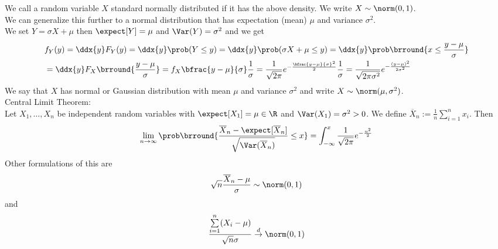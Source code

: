 We call a random variable $X$ standard normally distributed if it has the above density. We write $X\sim\norm(0,1)$.\\
We can generalize this further to a normal distribution that has expectation (mean) $\mu$ and variance $\sigma^2$.\\
We set $Y=\sigma X+\mu$ then $\expect[Y]=\mu$ and $\Var(Y)=\sigma^2$ and we get
\begin{align*}
    &f_Y(y)=\ddx{y}F_Y(y)=\ddx{y}\prob(Y\leq y)=\ddx{y}\prob(\sigma X+\mu\leq y)=\ddx{y}\prob\brround{x\leq\frac{y-\mu}{\sigma}}\\
    &=\ddx{y}F_X\brround{\frac{y-\mu}{\sigma}}=f_X\bfrac{y-\mu}{\sigma}\frac{1}{\sigma}=\frac{1}{\sqrt{2\pi}}e^{-\frac{\bfrac{y-\mu}{\sigma}^2}{2}}\frac{1}{\sigma}=\frac{1}{\sqrt{2\pi\sigma^2}}e^{-\frac{(y-\mu)^2}{2\sigma^2}}
\end{align*}
We say that $X$ has normal or Gaussian distribution with mean $\mu$ and variance $\sigma^2$ and write $X\sim\norm(\mu,\sigma^2)$.\\
Central Limit Theorem:\\
Let $X_1,\ldots, X_n$ be independent random variables with $\expect[X_1]=\mu\in\R$ and $\Var(X_1)=\sigma^2>0$. We define $\overline{X}_n:=\frac{1}{n}\sum\limits_{i=1}^n x_i$. Then
\[\lim_{n\to\infty}\prob\brround{\frac{\overline{X}_n-\expect[\overline{X}_n]}{\sqrt{\Var(\overline{X}_n)}}\leq x}=\int_{-\infty}^x\frac{1}{\sqrt{2\pi}}e^{-\frac{u^2}{2}}\]
Other formulations of this are
\[\sqrt{n}\frac{\overline{X}_n-\mu}{\sigma}\sim\norm(0,1)\]
and
\[\frac{\sum\limits_{i=1}^n(X_i-\mu)}{\sqrt{n}\sigma}\overset{d}{\to}\norm(0,1)\]